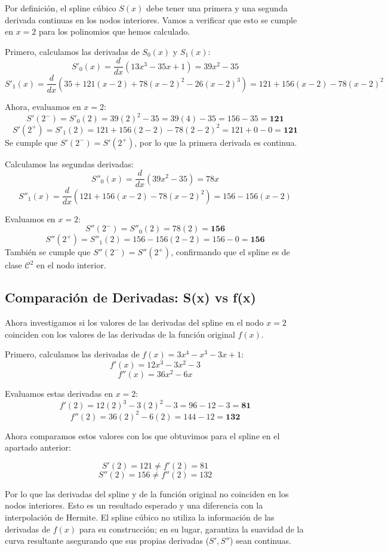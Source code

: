 \documentclass{article}
\begin{document}
Por definición, el spline cúbico $S(x)$ debe tener una primera y una segunda derivada continuas en los nodos interiores. Vamos a verificar que esto se cumple en $x=2$ para los polinomios que hemos calculado.


Primero, calculamos las derivadas de $S_0(x)$ y $S_1(x)$:
$$ S'_0(x) = \frac{d}{dx}(13x^3 - 35x + 1) = 39x^2 - 35 $$
$$ S'_1(x) = \frac{d}{dx}\left(35 + 121(x-2) + 78(x-2)^2 - 26(x-2)^3\right) = 121 + 156(x-2) - 78(x-2)^2 $$

Ahora, evaluamos en $x=2$:
$$ S'(2^-) = S'_0(2) = 39(2)^2 - 35 = 39(4) - 35 = 156 - 35 = \mathbf{121} $$
$$ S'(2^+) = S'_1(2) = 121 + 156(2-2) - 78(2-2)^2 = 121 + 0 - 0 = \mathbf{121} $$
Se cumple que $S'(2^-) = S'(2^+)$, por lo que la primera derivada es continua.

\vspace{1cm}


Calculamos las segundas derivadas:
$$ S''_0(x) = \frac{d}{dx}(39x^2 - 35) = 78x $$
$$ S''_1(x) = \frac{d}{dx}\left(121 + 156(x-2) - 78(x-2)^2\right) = 156 - 156(x-2) $$

Evaluamos en $x=2$:
$$ S''(2^-) = S''_0(2) = 78(2) = \mathbf{156} $$
$$ S''(2^+) = S''_1(2) = 156 - 156(2-2) = 156 - 0 = \mathbf{156} $$
También se cumple que $S''(2^-) = S''(2^+)$, confirmando que el spline es de clase $\mathcal{C}^2$ en el nodo interior.



\subsection{Comparación de Derivadas: S(x) vs f(x)}

Ahora investigamos si los valores de las derivadas del spline en el nodo $x=2$ coinciden con los valores de las derivadas de la función original $f(x)$.

Primero, calculamos las derivadas de $f(x) = 3x^4 - x^3 - 3x + 1$:
$$ f'(x) = 12x^3 - 3x^2 - 3 $$
$$ f''(x) = 36x^2 - 6x $$

Evaluamos estas derivadas en $x=2$:
$$ f'(2) = 12(2)^3 - 3(2)^2 - 3 = 96 - 12 - 3 = \mathbf{81} $$
$$ f''(2) = 36(2)^2 - 6(2) = 144 - 12 = \mathbf{132} $$

Ahora comparamos estos valores con los que obtuvimos para el spline en el apartado anterior:

$$ S'(2) = 121 \neq f'(2) = 81 $$
$$ S''(2) = 156 \neq f''(2) = 132 $$

Por lo que las derivadas del spline y de la función original no coinciden en los nodos interiores. Esto es un resultado esperado y una diferencia con la interpolación de Hermite. El spline cúbico no utiliza la información de las derivadas de $f(x)$ para su construcción; en su lugar, garantiza la suavidad de la curva resultante asegurando que sus propias derivadas ($S', S''$) sean continuas.
\end{document}
